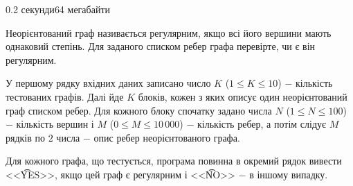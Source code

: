 \begin{problem}{}{}{}{0.2 секунди}{64 мегабайти}

Неорієнтований граф називається регулярним, якщо всі його вершини мають однаковий степінь. 
Для заданого списком ребер графа перевірте, чи є він регулярним.

\InputFile
У першому рядку вхідних даних записано число $K$ ($1 \le K \le 10$) $-$ кількість тестованих графів. 
Далі йде $K$ блоків, кожен з яких описує один неорієнтований граф списком ребер. 
Для кожного блоку спочатку задано числа $N$ ($1 \le N \le 100$) $-$ кількість вершин і $M$ ($0 \le M \le 10\,000$) $-$
кількість ребер, а потім слідує $M$ рядків по $2$ числа $-$ опис ребер неорієнтованого графа.

\OutputFile
Для кожного графа, що тестується, програма повинна в окремий рядок вивести <<{\t{YES}}>>, якщо цей граф
є регулярним і <<{\t{NO}}>> $-$ в іншому випадку.

\Example

\begin{example}
%
\end{example}

\end{problem}

